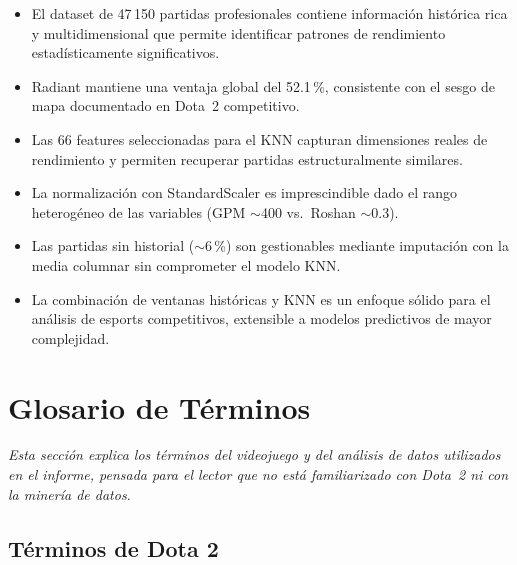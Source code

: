 \documentclass[12pt,a4paper]{article}
\begin{document}
\begin{itemize}
  \item El dataset de 47\,150 partidas profesionales contiene informaci\'on
        hist\'orica rica y multidimensional que permite identificar patrones de
        rendimiento estad\'isticamente significativos.
  \item Radiant mantiene una ventaja global del 52.1\,\%, consistente con el sesgo
        de mapa documentado en Dota~2 competitivo.
  \item Las 66 features seleccionadas para el KNN capturan dimensiones reales de
        rendimiento y permiten recuperar partidas estructuralmente similares.
  \item La normalizaci\'on con StandardScaler es imprescindible dado el rango
        heterog\'eneo de las variables (GPM $\sim$400 vs.\ Roshan $\sim$0.3).
  \item Las partidas sin historial ($\sim$6\,\%) son gestionables mediante
        imputaci\'on con la media columnar sin comprometer el modelo KNN.
  \item La combinaci\'on de ventanas hist\'oricas y KNN es un enfoque s\'olido para
        el an\'alisis de esports competitivos, extensible a modelos predictivos
        de mayor complejidad.
\end{itemize}

\newpage
\section{Glosario de T\'erminos}

\textit{Esta secci\'on explica los t\'erminos del videojuego y del an\'alisis
de datos utilizados en el informe, pensada para el lector que no est\'a
familiarizado con Dota~2 ni con la miner\'ia de datos.}

\subsection*{T\'erminos de Dota 2}
\end{document}
